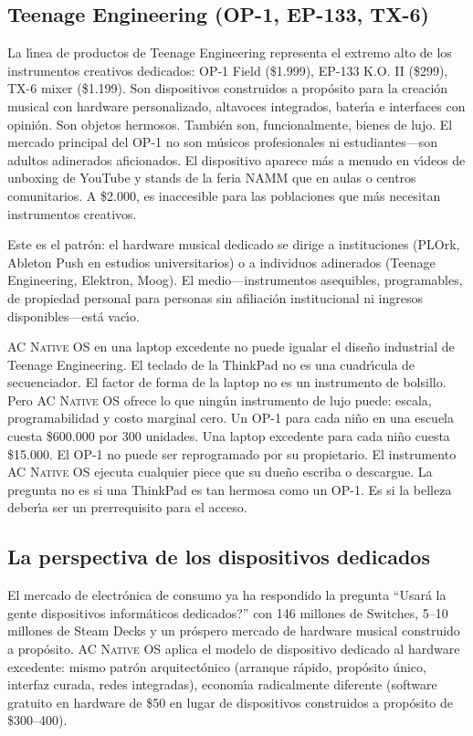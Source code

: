 \documentclass[10pt,letterpaper,twocolumn]{article}
\newcommand{\acos}{\textsc{AC Native OS}}
\begin{document}
\subsection{Teenage Engineering (OP-1, EP-133, TX-6)}

La l\'{\i}nea de productos de Teenage Engineering representa el extremo alto de los instrumentos creativos dedicados: OP-1 Field (\$1.999), EP-133 K.O. II (\$299), TX-6 mixer (\$1.199). Son dispositivos construidos a prop\'{o}sito para la creaci\'{o}n musical con hardware personalizado, altavoces integrados, bater\'{\i}a e interfaces con opini\'{o}n. Son objetos hermosos. Tambi\'{e}n son, funcionalmente, bienes de lujo. El mercado principal del OP-1 no son m\'{u}sicos profesionales ni estudiantes---son adultos adinerados aficionados. El dispositivo aparece m\'{a}s a menudo en v\'{\i}deos de unboxing de YouTube y stands de la feria NAMM que en aulas o centros comunitarios. A \$2.000, es inaccesible para las poblaciones que m\'{a}s necesitan instrumentos creativos.

Este es el patr\'{o}n: el hardware musical dedicado se dirige a instituciones (PLOrk, Ableton Push en estudios universitarios) o a individuos adinerados (Teenage Engineering, Elektron, Moog). El medio---instrumentos asequibles, programables, de propiedad personal para personas sin afiliaci\'{o}n institucional ni ingresos disponibles---est\'{a} vac\'{\i}o.

\acos{} en una laptop excedente no puede igualar el dise\~{n}o industrial de Teenage Engineering. El teclado de la ThinkPad no es una cuadr\'{\i}cula de secuenciador. El factor de forma de la laptop no es un instrumento de bolsillo. Pero \acos{} ofrece lo que ning\'{u}n instrumento de lujo puede: escala, programabilidad y costo marginal cero. Un OP-1 para cada ni\~{n}o en una escuela cuesta \$600.000 por 300 unidades. Una laptop excedente para cada ni\~{n}o cuesta \$15.000. El OP-1 no puede ser reprogramado por su propietario. El instrumento \acos{} ejecuta cualquier piece que su due\~{n}o escriba o descargue. La pregunta no es si una ThinkPad es tan hermosa como un OP-1. Es si la belleza deber\'{\i}a ser un prerrequisito para el acceso.

\subsection{La perspectiva de los dispositivos dedicados}

El mercado de electr\'{o}nica de consumo ya ha respondido la pregunta ``\textquestiondown Usar\'{a} la gente dispositivos inform\'{a}ticos dedicados?'' con 146 millones de Switches, 5--10 millones de Steam Decks y un pr\'{o}spero mercado de hardware musical construido a prop\'{o}sito. \acos{} aplica el modelo de dispositivo dedicado al hardware excedente: mismo patr\'{o}n arquitect\'{o}nico (arranque r\'{a}pido, prop\'{o}sito \'{u}nico, interfaz curada, redes integradas), econom\'{\i}a radicalmente diferente (software gratuito en hardware de \$50 en lugar de dispositivos construidos a prop\'{o}sito de \$300--400).
\end{document}
